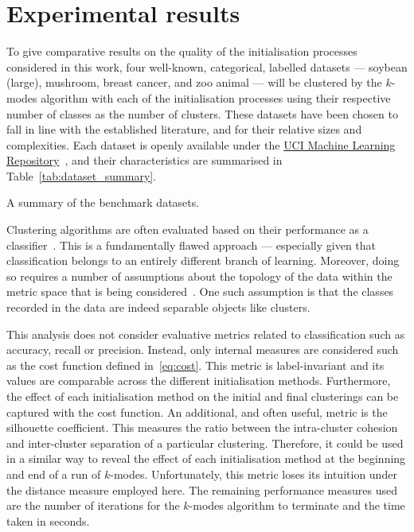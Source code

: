 \section{Experimental results}\label{sec:results}

To give comparative results on the quality of the initialisation processes 
considered in this work, four well-known, categorical, labelled datasets ---
soybean (large), mushroom, breast cancer, and zoo animal --- will be clustered
by the \(k\)-modes algorithm with each of the initialisation processes using
their respective number of classes as the number of clusters. These datasets
have been chosen to fall in line with the established literature, and for their
relative sizes and complexities. Each dataset is openly available under the
\href{http://mlr.cs.umass.edu/ml/}{UCI Machine Learning
Repository}~\cite{Dua2019}, and their characteristics are summarised in
Table~\ref{tab:dataset_summary}.

\begin{table}[htbp]
    \resizebox{\textwidth}{!}{%
        
    }\caption{A summary of the benchmark datasets.}\label{tab:dataset_summary}
\end{table}

Clustering algorithms are often evaluated based on their performance as a
classifier~\cite{%
    Arthur2007,Cao2009,Cao2012,Huang1998,Ng2007,Olaode2014,Schaeffer2007%
}. This is a fundamentally flawed approach --- especially given that
classification belongs to an entirely different branch of learning. Moreover,
doing so requires a number of assumptions about the topology of the data within
the metric space that is being considered~\cite{Memoli2011}. One such assumption
is that the classes recorded in the data are indeed separable objects like
clusters.

This analysis does not consider evaluative metrics related to classification
such as accuracy, recall or precision. Instead, only internal measures are
considered such as the cost function defined in~\eqref{eq:cost}. This metric is
label-invariant and its values are comparable across the different
initialisation methods.  Furthermore, the effect of each initialisation method
on the initial and final clusterings can be captured with the cost function. An
additional, and often useful, metric is the silhouette coefficient. This
measures the ratio between the intra-cluster cohesion and inter-cluster
separation of a particular clustering. Therefore, it could be used in a similar
way to reveal the effect of each initialisation method at the beginning and end
of a run of \(k\)-modes.  Unfortunately, this metric loses its intuition under
the distance measure employed here. The remaining performance measures used are
the number of iterations for the \(k\)-modes algorithm to terminate and the time
taken in seconds.


